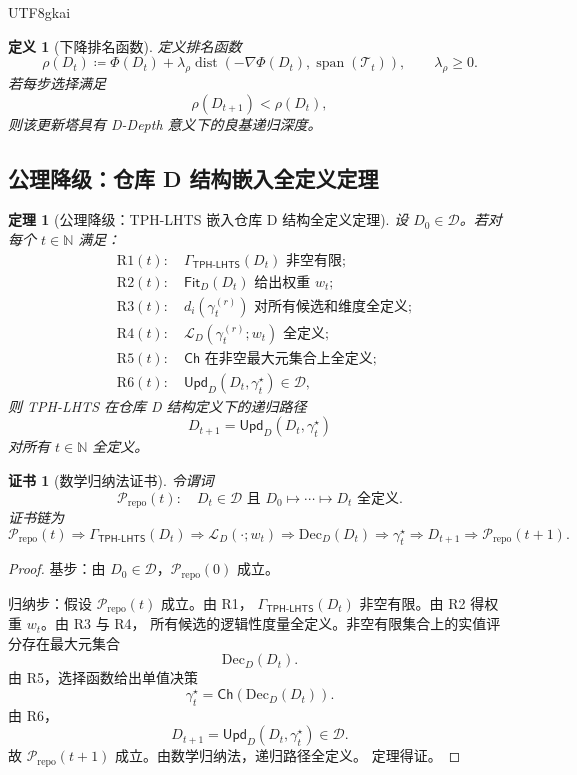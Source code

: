 \documentclass[12pt]{article}
\newtheorem{definition}{定义}[section]
\newtheorem{theorem}{定理}[section]
\newtheorem{Certificate}{证书}[section]
\newcommand{\NN}{\mathbb{N}}
\newcommand{\TPHLHTS}{\ensuremath{\mathsf{TPH\mbox{-}LHTS}}}
\newcommand{\DefEq}{\coloneqq}
\DeclareMathOperator{\Span}{span}
\DeclareMathOperator{\dist}{dist}
\begin{document}
\begin{CJK*}{UTF8}{gkai}
\begin{definition}[下降排名函数]
定义排名函数
\[
\boxed{
\rho(D_t)
\DefEq
\Phi(D_t)
+
\lambda_\rho
\dist\!\left(
-\nabla\Phi(D_t),
\Span(\mathcal T_t)
\right),
\qquad
\lambda_\rho\ge0.
}
\]
若每步选择满足
\[
\rho(D_{t+1})<\rho(D_t),
\]
则该更新塔具有 D-Depth 意义下的良基递归深度。
\end{definition}

\subsection{公理降级：仓库 D 结构嵌入全定义定理}
\label{subsec:repo-d-embedding-well-defined}

\begin{theorem}[公理降级：TPH-LHTS 嵌入仓库 D 结构全定义定理]
设 \(D_0\in\mathcal D\)。若对每个 \(t\in\NN\) 满足：
\[
\begin{aligned}
&\mathrm{R1}(t):\quad \Gamma_{\TPHLHTS}(D_t)\text{ 非空有限};\\
&\mathrm{R2}(t):\quad \mathsf{Fit}_D(D_t)\text{ 给出权重 }w_t;\\
&\mathrm{R3}(t):\quad d_i(\gamma_t^{(r)})\text{ 对所有候选和维度全定义};\\
&\mathrm{R4}(t):\quad \mathcal L_D(\gamma_t^{(r)};w_t)\text{ 全定义};\\
&\mathrm{R5}(t):\quad \mathsf{Ch}\text{ 在非空最大元集合上全定义};\\
&\mathrm{R6}(t):\quad \mathsf{Upd}_D(D_t,\gamma_t^\star)\in\mathcal D,
\end{aligned}
\]
则 TPH-LHTS 在仓库 D 结构定义下的递归路径
\[
D_{t+1}=\mathsf{Upd}_D(D_t,\gamma_t^\star)
\]
对所有 \(t\in\NN\) 全定义。
\end{theorem}

\begin{Certificate}[数学归纳法证书]
令谓词
\[
\mathcal P_{\mathrm{repo}}(t):
\quad
D_t\in\mathcal D
\text{ 且 }
D_0\mapsto\cdots\mapsto D_t
\text{ 全定义}.
\]
证书链为
\[
\boxed{
\mathcal P_{\mathrm{repo}}(t)
\Rightarrow
\Gamma_{\TPHLHTS}(D_t)
\Rightarrow
\mathcal L_D(\cdot;w_t)
\Rightarrow
\mathrm{Dec}_D(D_t)
\Rightarrow
\gamma_t^\star
\Rightarrow
D_{t+1}
\Rightarrow
\mathcal P_{\mathrm{repo}}(t+1).
}
\]
\end{Certificate}

\begin{proof}
基步：由 \(D_0\in\mathcal D\)，\(\mathcal P_{\mathrm{repo}}(0)\) 成立。

归纳步：假设 \(\mathcal P_{\mathrm{repo}}(t)\) 成立。由 R1，
\(\Gamma_{\TPHLHTS}(D_t)\) 非空有限。由 R2 得权重 \(w_t\)。由 R3 与 R4，
所有候选的逻辑性度量全定义。非空有限集合上的实值评分存在最大元集合
\[
\mathrm{Dec}_D(D_t).
\]
由 R5，选择函数给出单值决策
\[
\gamma_t^\star=\mathsf{Ch}(\mathrm{Dec}_D(D_t)).
\]
由 R6，
\[
D_{t+1}=\mathsf{Upd}_D(D_t,\gamma_t^\star)\in\mathcal D.
\]
故 \(\mathcal P_{\mathrm{repo}}(t+1)\) 成立。由数学归纳法，递归路径全定义。
定理得证。
\end{proof}


\end{CJK*}
\end{document}
